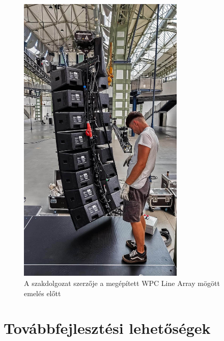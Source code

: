 \begin {figure}[H]
    \centering
    \includegraphics[width=300px]{figures/danci_wpc.jpg}
    \caption{A szakdolgozat szerzője a megépített WPC Line Array mögött emelés előtt}
\end {figure}
\section{Továbbfejlesztési lehetőségek}
